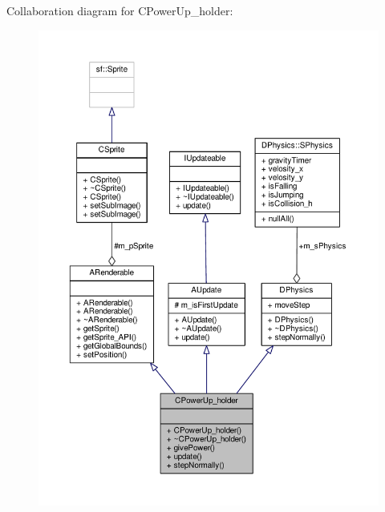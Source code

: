 Collaboration diagram for C\-Power\-Up\-\_\-holder\-:\nopagebreak
\begin{figure}[H]
\begin{center}
\leavevmode
\includegraphics[width=350pt]{classCPowerUp__holder__coll__graph}
\end{center}
\end{figure}

